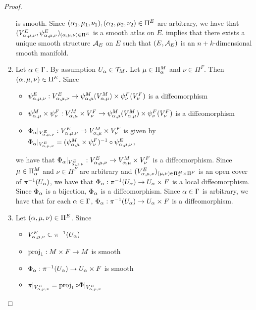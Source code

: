 \documentclass{book}
\begin{document}
\begin{proof}
\begin{enumerate}
			is smooth. Since $(\alpha_1, \mu_1, \nu_1), (\alpha_2, \mu_2, \nu_2) \in \Pi^E$ are arbitrary, we have that $(V^E_{\alpha, \mu, \nu}, \psi^E_{\alpha, \mu, \nu})_{(\alpha, \mu, \nu) \in \Pi^E}$ is a smooth atlas on $E$.  implies that there exists a unique smooth structure $\mathcal{A}_E$ on $E$ such that  $(E, \mathcal{A}_E)$ is an $n+k$-dimensional smooth manifold. 
			\item Let $\alpha \in \Gamma$. By assumption $U_{\alpha} \in \mathcal{T}_M$. Let $\mu \in \Pi^M_{\alpha}$ and $\nu \in \Pi^F$. Then $(\alpha, \mu, \nu) \in \Pi^E$. Since 
			\begin{itemize}
				\item $\psi^E_{\alpha, \mu, \nu}: V^E_{\alpha, \mu, \nu} \rightarrow \psi^M_{\alpha, \mu}(V^M_{\alpha, \mu}) \times \psi^F_{\nu}(V^F_{\nu})$ is a diffeomorphism
				\item $\psi^M_{\alpha, \mu} \times \psi^F_{\nu}: V^M_{\alpha, \mu} \times V^F_{\nu} \rightarrow \psi^M_{\alpha, \mu}(V^M_{\alpha, \mu}) \times \psi^F_{\nu}(V^F_{\nu})$ is a diffeomorphism  
				\item $\Phi_{\alpha}|_{V^E_{\alpha, \mu, \nu}}: V^E_{\alpha, \mu, \nu} \rightarrow V^M_{\alpha, \mu} \times V^F_{\nu}$ is given by 
				$\Phi_{\alpha}|_{V^E_{\alpha, \mu, \nu}} =  (\psi^M_{\alpha, \mu} \times \psi^F_{\nu})^{-1} \circ \psi^E_{\alpha, \mu, \nu}$,
			\end{itemize}
			we have that $\Phi_{\alpha}|_{V^E_{\alpha, \mu, \nu}}: V^E_{\alpha, \mu, \nu} \rightarrow V^M_{\alpha, \mu} \times V^F_{\nu}$ is a diffeomorphism. Since $\mu \in \Pi^M_{\alpha}$ and $\nu \in \Pi^F$ are arbitrary and $(V^E_{\alpha, \mu, \nu})_{(\mu, \nu) \in \Pi^M_{\alpha} \times \Pi^F}$ is an open cover of $\pi^{-1}(U_{\alpha})$, we have that $\Phi_{\alpha}: \pi^{-1}(U_{\alpha}) \rightarrow U_{\alpha} \times F$ is a local diffeomorphism. Since $\Phi_{\alpha}$ is a bijection, $\Phi_{\alpha}$ is a diffeomorphism. Since $\alpha \in \Gamma$ is arbitrary, we have that for each $\alpha \in \Gamma$, $\Phi_{\alpha}: \pi^{-1}(U_{\alpha}) \rightarrow U_{\alpha} \times F$ is a diffeomorphism.
			\item Let $(\alpha, \mu, \nu) \in \Pi^E$. Since 
			\begin{itemize}
				\item $V^E_{\alpha, \mu, \nu} \subset \pi^{-1}(U_{\alpha})$
				\item $\operatorname{\text{proj}}_1: M \times F \rightarrow M$ is smooth
				\item $\Phi_{\alpha}: \pi^{-1}(U_{\alpha}) \rightarrow U_{\alpha} \times F$ is smooth
				\item $\pi|_{V^E_{\alpha, \mu, \nu}} = \operatorname{\text{proj}}_1 \circ \Phi|_{V^E_{\alpha, \mu, \nu}}$

\end{itemize}
\end{enumerate}
\end{proof}
\end{document}
